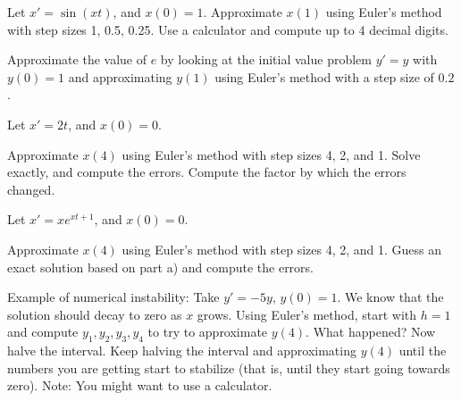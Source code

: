 \documentclass{ximera}
\begin{document}
\begin{exercise}%
    Let $x' = \sin(xt)$, and $x(0)=1$. Approximate $x(1)$ using Euler's method with step sizes 1, 0.5, 0.25. Use a calculator and compute up to 4 decimal digits.
\end{exercise}


\begin{exercise}
    Approximate the value of $e$ by looking at the initial value problem $y'=y$ with $y(0)=1$ and approximating $y(1)$ using Euler's method with a step size of $0.2$.
\end{exercise}

\begin{exercise}%
    Let $x' = 2t$, and $x(0)=0$.
    \begin{tasks}
        \task Approximate $x(4)$ using Euler's method with step sizes 4, 2, and 1.
        \task Solve exactly, and compute the errors.
        \task Compute the factor by which the errors changed.
    \end{tasks}
\end{exercise}

\begin{samepage}
    \begin{exercise}%
        Let $x' = x e^{xt+1}$, and $x(0)=0$.
        \begin{tasks}
            \task Approximate $x(4)$ using Euler's method with step sizes 4, 2, and 1.
            \task Guess an exact solution based on part a) and compute the errors.
        \end{tasks}
    \end{exercise}
\end{samepage}


\begin{exercise}
    Example of numerical instability: Take $y' = -5y$, $y(0) = 1$.  We know that the solution should decay to zero as $x$ grows. Using Euler's method, start with $h=1$ and compute $y_1, y_2, y_3, y_4$ to try to approximate $y(4)$.  What happened? Now halve the interval.  Keep halving the interval and approximating $y(4)$ until the numbers you are getting start to stabilize (that is, until they start going towards zero). Note: You might want to use a calculator.
\end{exercise}
\end{document}
